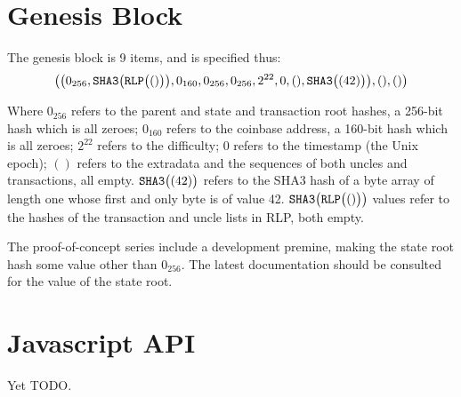 \documentclass[9pt,oneside]{amsart}
\begin{document}
\section{Genesis Block}\label{app:genesis}

The genesis block is 9 items, and is specified thus:
\begin{equation}
\big( \big( 0_{256}, \mathtt{\tiny SHA3}\big(\mathtt{\tiny RLP}\big( () \big)\big), 0_{160}, 0_{256}, 0_{256}, 2^{22}, 0, (), \mathtt{\tiny SHA3}\big( (42) \big) \big), (), () \big)
\end{equation}

Where $0_{256}$ refers to the parent and state and transaction root hashes, a 256-bit hash which is all zeroes; $0_{160}$ refers to the coinbase address, a 160-bit hash which is all zeroes; $2^{22}$ refers to the difficulty; 0 refers to the timestamp (the Unix epoch); $()$ refers to the extradata and the sequences of both uncles and transactions, all empty. $\mathtt{\tiny SHA3}\big( (42) \big)$ refers to the SHA3 hash of a byte array of length one whose first and only byte is of value 42. $\mathtt{\tiny SHA3}\big(\mathtt{\tiny RLP}\big( () \big)\big)$ values refer to the hashes of the transaction and uncle lists in RLP, both empty.

The proof-of-concept series include a development premine, making the state root hash some value other than $0_{256}$. The latest documentation should be consulted for the value of the state root.

\section{Javascript API}\label{app:jsapi}

Yet TODO.
\end{document}
